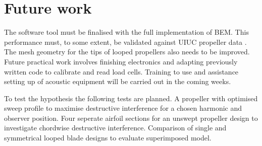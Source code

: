 \documentclass{article}
\begin{document}
\section{Future work}
The software tool must be finalised with the full implementation of BEM.
This performance must, to some extent, be validated against UIUC propeller data \cite{UIUC_database}.
The mesh geometry for the tips of looped propellers also needs to be improved.
Future practical work involves finishing electronics and adapting previously written code to calibrate and read load cells.
Training to use and assistance setting up of acoustic equipment will be carried out in the coming weeks.

To test the hypothesis the following tests are planned.
A propeller with optimised sweep profile to maximise destructive interference for a chosen harmonic and observer position.
Four seperate airfoil sections for an unswept propeller design to investigate chordwise destructive interference.
Comparison of single and symmetrical looped blade designs to evaluate superimposed model.
\printbibliography
\end{document}
